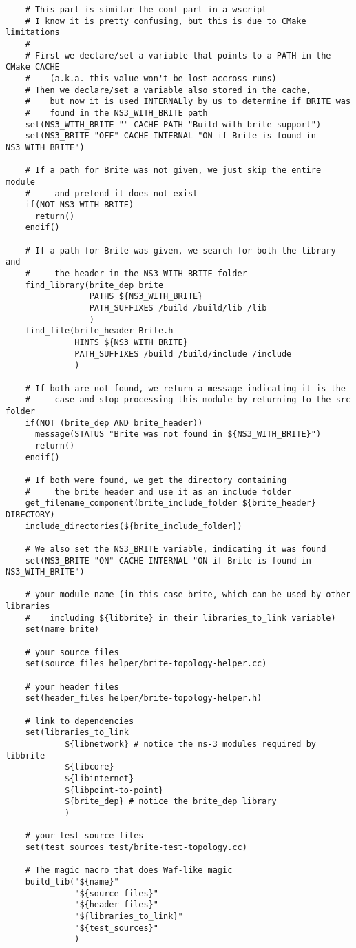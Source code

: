 \documentclass{article}
\begin{document}
    \begin{verbatim}
    # This part is similar the conf part in a wscript
    # I know it is pretty confusing, but this is due to CMake limitations
    #
    # First we declare/set a variable that points to a PATH in the CMake CACHE
    #    (a.k.a. this value won't be lost accross runs)
    # Then we declare/set a variable also stored in the cache,
    #    but now it is used INTERNALly by us to determine if BRITE was
    #    found in the NS3_WITH_BRITE path
    set(NS3_WITH_BRITE "" CACHE PATH "Build with brite support")
    set(NS3_BRITE "OFF" CACHE INTERNAL "ON if Brite is found in NS3_WITH_BRITE")

    # If a path for Brite was not given, we just skip the entire module
    #     and pretend it does not exist
    if(NOT NS3_WITH_BRITE)
      return()
    endif()

    # If a path for Brite was given, we search for both the library and
    #     the header in the NS3_WITH_BRITE folder
    find_library(brite_dep brite
                 PATHS ${NS3_WITH_BRITE}
                 PATH_SUFFIXES /build /build/lib /lib
                 )
    find_file(brite_header Brite.h
              HINTS ${NS3_WITH_BRITE}
              PATH_SUFFIXES /build /build/include /include
              )

    # If both are not found, we return a message indicating it is the
    #     case and stop processing this module by returning to the src folder
    if(NOT (brite_dep AND brite_header))
      message(STATUS "Brite was not found in ${NS3_WITH_BRITE}")
      return()
    endif()

    # If both were found, we get the directory containing
    #     the brite header and use it as an include folder
    get_filename_component(brite_include_folder ${brite_header} DIRECTORY)
    include_directories(${brite_include_folder})

    # We also set the NS3_BRITE variable, indicating it was found
    set(NS3_BRITE "ON" CACHE INTERNAL "ON if Brite is found in NS3_WITH_BRITE")

    # your module name (in this case brite, which can be used by other libraries
    #    including ${libbrite} in their libraries_to_link variable)
    set(name brite)

    # your source files
    set(source_files helper/brite-topology-helper.cc)

    # your header files
    set(header_files helper/brite-topology-helper.h)

    # link to dependencies
    set(libraries_to_link
            ${libnetwork} # notice the ns-3 modules required by libbrite
            ${libcore}
            ${libinternet}
            ${libpoint-to-point}
            ${brite_dep} # notice the brite_dep library
            )

    # your test source files
    set(test_sources test/brite-test-topology.cc)

    # The magic macro that does Waf-like magic
    build_lib("${name}"
              "${source_files}"
              "${header_files}"
              "${libraries_to_link}"
              "${test_sources}"
              )
    \end{verbatim}
\end{document}
